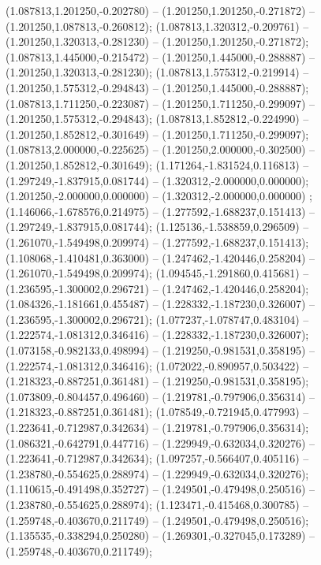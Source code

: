  (1.087813,1.201250,-0.202780) -- (1.201250,1.201250,-0.271872) -- (1.201250,1.087813,-0.260812);
 (1.087813,1.320312,-0.209761) -- (1.201250,1.320313,-0.281230) -- (1.201250,1.201250,-0.271872);
 (1.087813,1.445000,-0.215472) -- (1.201250,1.445000,-0.288887) -- (1.201250,1.320313,-0.281230);
 (1.087813,1.575312,-0.219914) -- (1.201250,1.575312,-0.294843) -- (1.201250,1.445000,-0.288887);
 (1.087813,1.711250,-0.223087) -- (1.201250,1.711250,-0.299097) -- (1.201250,1.575312,-0.294843);
 (1.087813,1.852812,-0.224990) -- (1.201250,1.852812,-0.301649) -- (1.201250,1.711250,-0.299097);
 (1.087813,2.000000,-0.225625) -- (1.201250,2.000000,-0.302500) -- (1.201250,1.852812,-0.301649);
 (1.171264,-1.831524,0.116813) -- (1.297249,-1.837915,0.081744) -- (1.320312,-2.000000,0.000000);
 (1.201250,-2.000000,0.000000) -- (1.320312,-2.000000,0.000000) ;
 (1.146066,-1.678576,0.214975) -- (1.277592,-1.688237,0.151413) -- (1.297249,-1.837915,0.081744);
 (1.125136,-1.538859,0.296509) -- (1.261070,-1.549498,0.209974) -- (1.277592,-1.688237,0.151413);
 (1.108068,-1.410481,0.363000) -- (1.247462,-1.420446,0.258204) -- (1.261070,-1.549498,0.209974);
 (1.094545,-1.291860,0.415681) -- (1.236595,-1.300002,0.296721) -- (1.247462,-1.420446,0.258204);
 (1.084326,-1.181661,0.455487) -- (1.228332,-1.187230,0.326007) -- (1.236595,-1.300002,0.296721);
 (1.077237,-1.078747,0.483104) -- (1.222574,-1.081312,0.346416) -- (1.228332,-1.187230,0.326007);
 (1.073158,-0.982133,0.498994) -- (1.219250,-0.981531,0.358195) -- (1.222574,-1.081312,0.346416);
 (1.072022,-0.890957,0.503422) -- (1.218323,-0.887251,0.361481) -- (1.219250,-0.981531,0.358195);
 (1.073809,-0.804457,0.496460) -- (1.219781,-0.797906,0.356314) -- (1.218323,-0.887251,0.361481);
 (1.078549,-0.721945,0.477993) -- (1.223641,-0.712987,0.342634) -- (1.219781,-0.797906,0.356314);
 (1.086321,-0.642791,0.447716) -- (1.229949,-0.632034,0.320276) -- (1.223641,-0.712987,0.342634);
 (1.097257,-0.566407,0.405116) -- (1.238780,-0.554625,0.288974) -- (1.229949,-0.632034,0.320276);
 (1.110615,-0.491498,0.352727) -- (1.249501,-0.479498,0.250516) -- (1.238780,-0.554625,0.288974);
 (1.123471,-0.415468,0.300785) -- (1.259748,-0.403670,0.211749) -- (1.249501,-0.479498,0.250516);
 (1.135535,-0.338294,0.250280) -- (1.269301,-0.327045,0.173289) -- (1.259748,-0.403670,0.211749);
